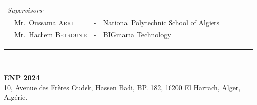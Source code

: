 {\begin{titlepage}
\begin{center}
\begin{tabular}{llcl}
            \\
            \textit{Supervisors:}                                             &   &                                        & \\
            \multicolumn{2}{l}{~~Mr.\ Oussama \textsc{Arki}}                  & - & National Polytechnic School of Algiers   \\
            \multicolumn{2}{l}{~~Mr.\ Hachem \textsc{Betrounie}}              & - & BIGmama Technology                       \\
        \end{tabular}
    \end{center}

    \vspace*{12mm}

    \rule{\linewidth}{1pt} \\[5mm]
    \begin{center}
        \textbf{ENP 2024} \\
        10, Avenue des Frères Oudek, Hassen Badi, BP. 182, 16200 El Harrach, Alger, Algérie.
    \end{center}

\end{titlepage}
}